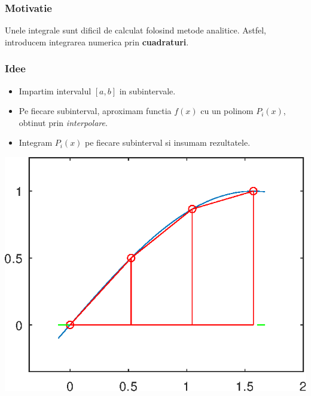 \documentclass{article}
\begin{document}
\subsubsection{Motivatie}
\tab Unele integrale sunt dificil de calculat folosind metode analitice. Astfel, introducem integrarea numerica prin \textbf{cuadraturi}.\framebox[0.3cm][r]{\footnotemark}


\subsubsection{Idee}
\begin{minipage}{0.7\textwidth}
    \begin{itemize}
        \item Impartim intervalul $[a,b]$ in subintervale.
        \item Pe fiecare subinterval, aproximam functia $f(x)$ cu un polinom $P_i(x)$, obtinut prin \textit{interpolare}.
        \item Integram $P_i(x)$ pe fiecare subinterval si insumam rezultatele.
    \end{itemize}
\end{minipage}\hspace{0.75cm}
\begin{minipage}{0.5\textwidth}
    \includegraphics[scale=0.5]{ex_integrare_numerica}
\end{minipage}
\end{document}
